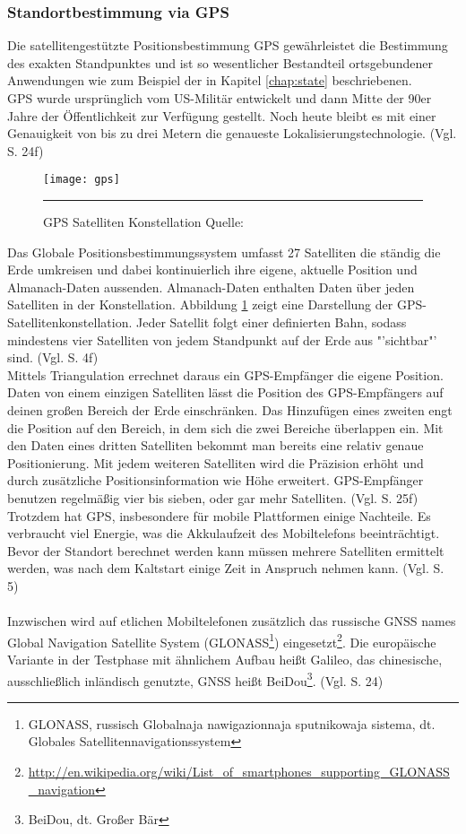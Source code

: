 \subsubsection{Standortbestimmung via \gls{GPS}}
Die satellitengestützte Positionsbestimmung \gls{GPS} gewährleistet die Bestimmung des exakten Standpunktes und ist so wesentlicher Bestandteil ortsgebundener Anwendungen wie zum Beispiel der in Kapitel \ref{chap:state} beschriebenen. \\
\gls{GPS} wurde ursprünglich vom US-Militär entwickelt und dann Mitte der 90er Jahre der Öffentlichkeit zur Verfügung gestellt. Noch heute bleibt es mit einer Genauigkeit von bis zu drei Metern die genaueste Lokalisierungstechnologie. (Vgl. \cite{gps} S. 24f)
\begin{figure}[H]  
    \centering  
    \texttt{[image: gps]} 
    \rule{35em}{0.5pt}
    \caption[GPS Satelliten Konstellation]{GPS Satelliten Konstellation  Quelle: \cite{fig:gps}}
    \label{fig:gps}
\end{figure}
Das Globale Positionsbestimmungssystem umfasst 27 Satelliten die ständig die Erde umkreisen und dabei kontinuierlich ihre eigene, aktuelle Position und Almanach-Daten aussenden. Almanach-Daten enthalten Daten über jeden Satelliten in der Konstellation. Abbildung \ref{fig:gps} zeigt eine Darstellung der GPS-Satellitenkonstellation. Jeder Satellit folgt einer definierten Bahn, sodass mindestens vier Satelliten von jedem Standpunkt auf der Erde aus "'sichtbar"' sind. (Vgl. \cite{location} S. 4f)\\
Mittels Triangulation errechnet daraus ein \gls{GPS}-Empfänger die eigene Position. Daten von einem einzigen Satelliten lässt die Position des \gls{GPS}-Empfängers auf deinen großen Bereich der Erde einschränken. Das Hinzufügen eines zweiten engt die Position auf den Bereich, in dem sich die zwei Bereiche überlappen ein. Mit den Daten eines dritten Satelliten bekommt man bereits eine relativ genaue Positionierung. Mit jedem weiteren Satelliten wird die Präzision erhöht und durch zusätzliche Positionsinformation wie Höhe erweitert. \gls{GPS}-Empfänger benutzen regelmäßig vier bis sieben, oder gar mehr Satelliten. (Vgl. \cite{gps} S. 25f)\\
Trotzdem hat \gls{GPS}, insbesondere für mobile Plattformen einige Nachteile. Es verbraucht viel Energie, was die Akkulaufzeit des Mobiltelefons beeinträchtigt. Bevor der Standort berechnet werden kann müssen mehrere Satelliten ermittelt werden, was nach dem Kaltstart einige Zeit in Anspruch nehmen kann. (Vgl. \cite{location} S. 5)\\\\
Inzwischen wird auf etlichen Mobiltelefonen zusätzlich das russische \gls{GNSS} names Global Navigation Satellite System (\gls{GLONASS}\footnote{ GLONASS, russisch Globalnaja nawigazionnaja sputnikowaja sistema, dt. Globales Satellitennavigationssystem}) eingesetzt\footnote{ \url{http://en.wikipedia.org/wiki/List_of_smartphones_supporting_GLONASS_navigation}}.
Die europäische Variante in der Testphase mit ähnlichem Aufbau heißt Galileo, das chinesische, ausschließlich inländisch genutzte, \gls{GNSS} heißt BeiDou\footnote{ BeiDou, dt. Großer Bär}. (Vgl. \cite{gps} S. 24)
